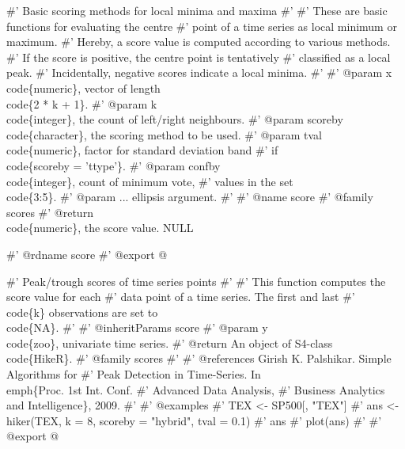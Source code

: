 \documentclass[a4paper]{article}
\begin{document}
\nwenddocs{}\endmoddef
#' Basic scoring methods for local minima and maxima
#'
#' These are basic functions for evaluating the centre
#' point of a time series as local minimum or maximum.
#' Hereby, a score value is computed according to various methods.
#' If the score is positive, the centre point is tentatively
#' classified as a local peak.
#' Incidentally, negative scores indicate a local minima.
#'
#' @param x \\code\{numeric\}, vector of length \\code\{2 * k + 1\}.
#' @param k \\code\{integer\}, the count of left/right neighbours.
#' @param scoreby \\code\{character\}, the scoring method to be used.
#' @param tval \\code\{numeric\}, factor for standard deviation band
#' if \\code\{scoreby = 'ttype'\}.
#' @param confby \\code\{integer\}, count of minimum vote,
#' values in the set \\code\{3:5\}.
#' @param ... ellipsis argument.
#'
#' @name score
#' @family scores
#' @return \\code\{numeric\}, the score value.
NULL

#' @rdname score
#' @export
\nwendcode{}@

\nwenddocs{}\endmoddef
#' Peak/trough scores of time series points
#'
#' This function computes the score value for each
#' data point of a time series. The first and last
#' \\code\{k\} observations are set to \\code\{NA\}.
#'
#' @inheritParams score
#' @param y \\code\{zoo\}, univariate time series.
#' @return An object of S4-class \\code\{HikeR\}.
#' @family scores
#'
#' @references Girish K. Palshikar. Simple Algorithms for
#' Peak Detection in Time-Series. In \\emph\{Proc. 1st Int. Conf.
#' Advanced Data Analysis,
#' Business Analytics and Intelligence\}, 2009.
#'
#' @examples
#' TEX <- SP500[, "TEX"]
#' ans <- hiker(TEX, k = 8, scoreby = "hybrid", tval = 0.1)
#' ans
#' plot(ans)
#'
#' @export
\nwendcode{}@
\end{document}
